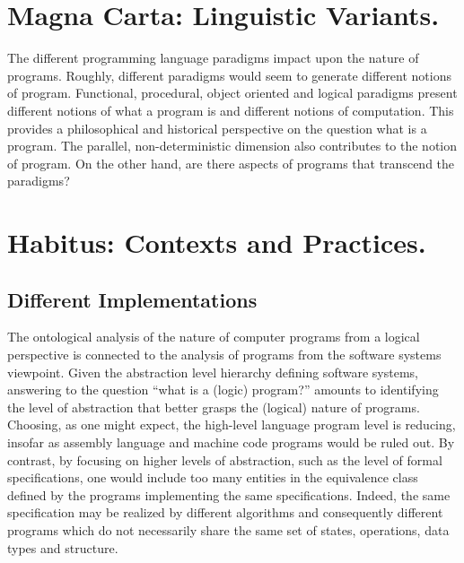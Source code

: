 \documentclass[]{article}
\begin{document}
{\color{red}{Tomas?}}

{\color{red}{Wendy?}}

\section{Magna Carta: Linguistic Variants.}

{\color{red}{Ray's note}}

The different programming language paradigms impact upon the nature of programs. Roughly, different paradigms would seem to generate different notions of program. Functional, procedural, object oriented and logical paradigms present different notions of what a program is and different notions of computation. This provides a philosophical and historical perspective on the question what is a program. The parallel, non-deterministic dimension also contributes to the notion of program. On the other hand, are there aspects of programs that transcend the paradigms?



\section{Habitus: Contexts and Practices.}


\subsection{Different Implementations}

{\color{red}{GP?}}

The ontological analysis of the nature of computer programs from a logical perspective is connected to the analysis of programs from the software systems viewpoint. Given the abstraction level hierarchy defining software systems, answering to the question “what is a (logic) program?” amounts to identifying the level of abstraction that better grasps the (logical) nature of programs. Choosing, as one might expect,
the high-level language program level is reducing, insofar as assembly language and machine
code programs would be ruled out. By contrast, by focusing on higher levels of abstraction, such
as the level of formal specifications, one would include too many entities in the equivalence
class defined by the programs implementing the same specifications. Indeed, the same
specification may be realized by different algorithms and consequently different programs which
do not necessarily share the same set of states, operations, data types and structure.
\end{document}
